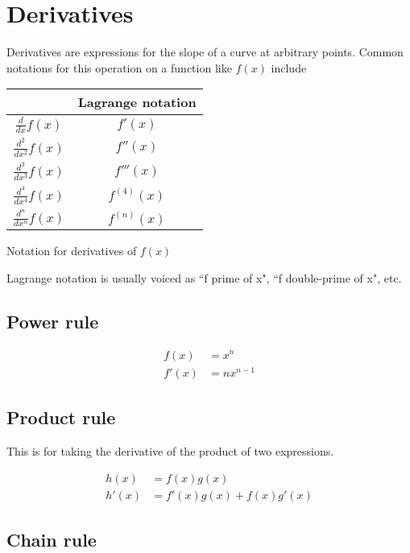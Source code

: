 \section{Derivatives}

Derivatives are expressions for the slope of a curve at arbitrary points. Common
notations for this operation on a function like $f(x)$ include

\begin{booktable}
  \begin{tabular}{|cc|}
    \hline
    \rowcolor{headingbg}
    \multicolumn{1}{|c}{\textbf{Leibniz notation}} &
      \multicolumn{1}{c|}{\textbf{Lagrange notation}} \\
    \hline
    $\frac{d}{dx} f(x)$ & $f'(x)$ \\
    $\frac{d^2}{dx^2} f(x)$ & $f''(x)$ \\
    $\frac{d^3}{dx^3} f(x)$ & $f'''(x)$ \\
    $\frac{d^4}{dx^4} f(x)$ & $f^{(4)}(x)$ \\
    $\frac{d^n}{dx^n} f(x)$ & $f^{(n)}(x)$ \\
    \hline
  \end{tabular}
  \caption{Notation for derivatives of $f(x)$}
\end{booktable}

Lagrange notation is usually voiced as ``f prime of x", ``f double-prime of x",
etc.

\subsection{Power rule}

\begin{align*}
  f(x) &= x^n \\
  f'(x) &= nx^{n - 1}
\end{align*}

\subsection{Product rule}

This is for taking the derivative of the product of two expressions.

\begin{align*}
  h(x) &= f(x)g(x) \\
  h'(x) &= f'(x)g(x) + f(x)g'(x)
\end{align*}

\subsection{Chain rule}

